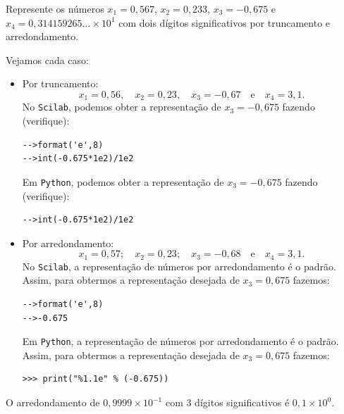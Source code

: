 \begin{ex} Represente os números $x_1 = 0,567$, $x_2 = 0,233$, $x_3 = -0,675$ e $x_4 = 0,314159265 \ldots \times 10^1$ com dois dígitos significativos por truncamento e arredondamento.
\end{ex}
\begin{sol} Vejamos cada caso:
  \begin{itemize}
  \item Por truncamento:
    \begin{equation*}
      x_1=0,56,\quad x_2=0,23,\quad x_3=-0,67\quad\mbox{e}\quad x_4 = 3,1.
    \end{equation*}
\ifisscilab
No \verb+Scilab+, podemos obter a representação de $x_3 = -0,675$ fazendo (verifique):
\begin{verbatim}
-->format('e',8)
-->int(-0.675*1e2)/1e2
\end{verbatim}
\fi
\ifispython
Em \verb+Python+, podemos obter a representação de $x_3 = -0,675$ fazendo (verifique):
\begin{verbatim}
-->int(-0.675*1e2)/1e2
\end{verbatim}
\fi
  \item Por arredondamento:
    \begin{equation*}
      x_1=0,57;\quad x_2=0,23;\quad x_3=-0,68\quad\mbox{e}\quad x_4 = 3,1.  
    \end{equation*}
\ifisscilab
No \verb+Scilab+, a representação de números por arredondamento é o padrão. Assim, para obtermos a representação desejada de $x_3 = 0,675$ fazemos:
\begin{verbatim}
-->format('e',8)
-->-0.675
\end{verbatim}
\fi
\ifispython
Em \verb+Python+, a representação de números por arredondamento é o padrão. Assim, para obtermos a representação desejada de $x_3 = 0,675$ fazemos:
\begin{verbatim}
>>> print("%1.1e" % (-0.675))
\end{verbatim}
\fi
  \end{itemize}
\end{sol}


\begin{ex}
  O arredondamento de $0,9999\times 10^{-1}$ com $3$ dígitos significativos é $0,1\times 10^{0}$.
\end{ex}


